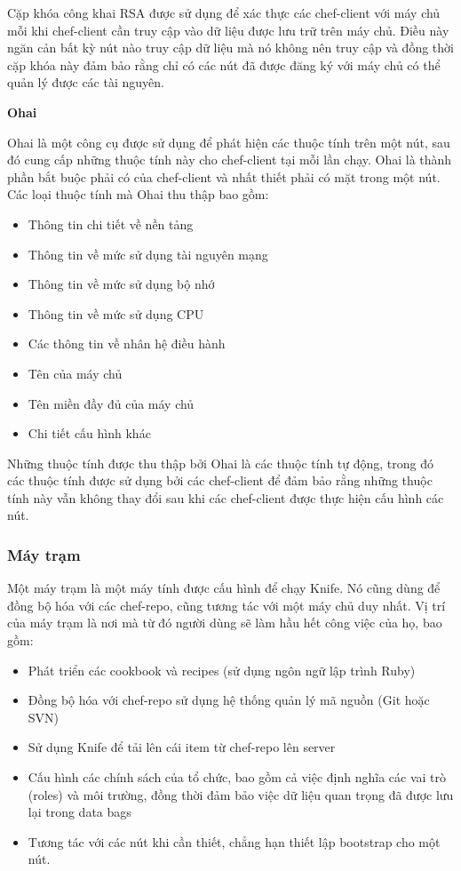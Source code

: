Cặp khóa công khai RSA được sử dụng để xác thực các chef-client với máy chủ mỗi khi chef-client cần truy cập vào dữ liệu được lưu trữ trên máy chủ. Điều này ngăn cản bất kỳ nút nào truy cập dữ liệu mà nó không nên truy cập và đồng thời cặp khóa này đảm bảo rằng chỉ có các nút đã được đăng ký với máy chủ có thể quản lý được các tài nguyên.

\textbf{Ohai}

Ohai là một công cụ được sử dụng để phát hiện các thuộc tính trên một nút, sau đó cung cấp những thuộc tính này cho chef-client tại mỗi lần chạy. Ohai là thành phần bắt buộc phải có của chef-client và nhất thiết phải có mặt trong một nút. Các loại thuộc tính mà Ohai thu thập bao gồm:

\begin{itemize}
\item Thông tin chi tiết về nền tảng
\item Thông tin về mức sử dụng tài nguyên mạng
\item Thông tin về mức sử dụng bộ nhớ
\item Thông tin về mức sử dụng CPU
\item Các thông tin về nhân hệ điều hành
\item Tên của máy chủ
\item Tên miền đầy đủ của máy chủ
\item Chi tiết cấu hình khác
\end{itemize}

Những thuộc tính được thu thập bởi Ohai là các thuộc tính tự động, trong đó các thuộc tính được sử dụng bởi các chef-client để đảm bảo rằng những thuộc tính này vẫn không thay đổi sau khi các chef-client được thực hiện cấu hình các nút.

\newpage
\clearpage

\subsubsection{Máy trạm}


Một máy trạm là một máy tính được cấu hình để chạy Knife. Nó cũng dùng để đồng bộ hóa với các chef-repo, cũng tương tác với một máy chủ duy nhất. Vị trí của máy trạm là nơi mà từ đó người dùng sẽ làm hầu hết công việc của họ, bao gồm:

\begin{itemize}
\item Phát triển các cookbook và recipes (sử dụng ngôn ngữ lập trình Ruby)
\item Đồng bộ hóa với chef-repo sử dụng hệ thống quản lý mã nguồn (Git hoặc SVN)
\item Sử dụng Knife để tải lên cái item từ chef-repo lên server
\item Cấu hình các chính sách của tổ chức, bao gồm cả việc định nghĩa các vai trò (roles) và môi trường, đồng thời đảm bảo việc dữ liệu quan trọng đã được lưu lại trong data bags
\item Tương tác với các nút khi cần thiết, chẳng hạn thiết lập bootstrap cho một nút.
\end{itemize}

